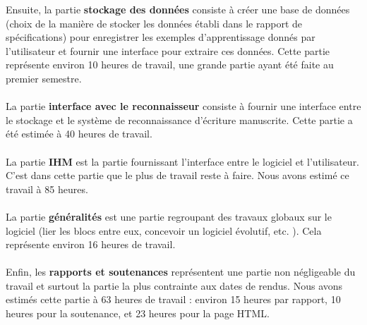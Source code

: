Ensuite, la partie \textbf{stockage des données} consiste à créer une base de données (choix de la manière de stocker les données établi dans le rapport de spécifications) pour enregistrer les exemples d’apprentissage donnés par l’utilisateur et fournir une interface pour extraire ces données. Cette partie représente environ 10 heures de travail, une grande partie ayant été faite au premier semestre.

\paragraph{}

La partie \textbf{interface avec le reconnaisseur} consiste à fournir une interface entre le stockage et le système de reconnaissance d’écriture manuscrite. Cette partie a été estimée à 40 heures de travail.

\paragraph{}

La partie \textbf{IHM} est la partie fournissant l’interface entre le logiciel et l’utilisateur. C’est dans cette partie que le plus de travail reste à faire. Nous avons estimé ce travail à 85 heures.

\paragraph{}

La partie \textbf{généralités} est une partie regroupant des travaux globaux sur le logiciel (lier les blocs entre eux, concevoir un logiciel évolutif, etc. ). Cela représente environ 16 heures de travail.

\paragraph{}

Enfin, les \textbf{rapports et soutenances} représentent une partie non négligeable du travail et surtout la partie la plus contrainte aux dates de rendus. Nous avons estimés cette partie à 63 heures de travail : environ 15 heures par rapport, 10 heures pour la soutenance, et 23 heures pour la page HTML.

\paragraph{}

